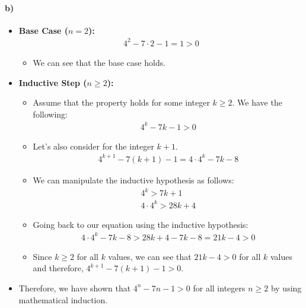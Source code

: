 \documentclass[12pt]{article}
\begin{document}
\paragraph*{b)}
\begin{itemize}
    \item \textbf{Base Case ($n = 2$):}
    \begin{equation*}
        \begin{split}
         4^2 - 7 \cdot 2 - 1 = 1 > 0 
        \end{split}
    \end{equation*}
    \begin{itemize}
        \item We can see that the base case holds.
    \end{itemize}
    \item \textbf{Inductive Step ($n \geq 2$):}
    \begin{itemize}
        \item Assume that the property holds for some integer $k \geq 2$. We have the following:
        \begin{equation*}
            \begin{split}
             4^k - 7k - 1 > 0 
            \end{split}
        \end{equation*}
        \item Let's also consider for the integer $k + 1$.
        \begin{equation*}
            \begin{split}
             4^{k+1} - 7(k+1) - 1 = 4 \cdot 4^k - 7k - 8
            \end{split}
        \end{equation*}
        \item We can manipulate the inductive hypothesis as follows:
        \begin{equation*}
            \begin{split}
             4^k > 7k + 1\\
             4 \cdot 4^k > 28k + 4
            \end{split}
        \end{equation*}
        \item Going back to our equation using the inductive hypothesis:
        \begin{equation*}
            \begin{split}
                4 \cdot 4^k - 7k - 8 > 28k + 4 - 7k - 8 = 21k - 4 > 0
            \end{split}
        \end{equation*}
        \item Since $k \geq 2$ for all $k$ values, we can see that $21k-4 > 0$ for all $k$ values and therefore, $4^{k+1} - 7(k+1) - 1 > 0$.
    \end{itemize}
    \item Therefore, we have shown that $4^n - 7n - 1 > 0$ for all integers $n \geq 2$ by using mathematical induction.
\end{itemize}
\end{document}
